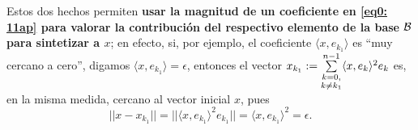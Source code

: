 \begin{nota}
Estos dos hechos permiten \textbf{usar la magnitud de un coeficiente en 
\eqref{eq0: 11ap} para valorar la contribución del respectivo 
elemento de la base $\mathcal{B}$ para sintetizar a $x$};
en efecto, si, por ejemplo, el coeficiente $\langle x, e_{k_{1}} \rangle$
es ``muy cercano a cero'', digamos $\langle x, e_{k_{1}} \rangle = \epsilon$,  
entonces el vector 
$x_{k_{1}}:= \sum\limits_{\substack{ {k=0}, \\  {k \neq k_{1}} }}^{n-1}
\langle x , e_{k} \rangle^{2} e_{k}$
es, en la misma medida, cercano al vector inicial $x$, pues
\[
|| x - x_{k_{1}} || = || \langle x , e_{k_{1}} \rangle^{2} e_{k_{1}} ||
= \langle x , e_{k_{1}} \rangle^{2} = \epsilon.
\]
\end{nota}


\begin{comment}
Ya estamos listos par dar un ejemplo de una BON que
no es una base de Hamel.

\begin{ejemplo}
(de un subconjunto de un espacio
con producto punto que sea maximal ortonormal pero no maximal l.i.)
\TODO{Dónde introduzco al espacio de sucesiones $\ell^{2}$??
Yo creo que justo después de G-S, o sea, justo antes de esta.}

Considere al espacio de Hilbert
\[
\ell^{2}= \{ x: \IN \longrightarrow \IR | \hspace{0.2cm} 
\suma{k=1}{\infty}{|x_{k}|^{2}}< \infty \}
\]

con el producto punto
\[
<x,y>= \suma{k=1}{\infty}{x_{k}y_{k}}.
\]

Sea el subconjunto de este
\[
\cali{B}:= \{e_{i}: \IN \longrightarrow \IR| \hspace{0.2cm} i \in \IN \},
\]

donde $e_{i}$ es la sucesión dada por la regla
\[
e_{i}(j)=\delta_{i,j}, \hspace{0.4cm} j \in \IN.
\]


\begin{itemize}
\item[i)]($\cali{B}$ es un subconjunto maximal ortonormal) 
Claro que todos los elementos de $\cali{B}$ tienen norma uno;
además, si $x \in \ell^{2}$ es tal que para todo índice $i$
se tiene la igualdad
\[
x_{i}= \suma{k=1}{\infty}{x(k)e_{i}(k)}=<x,e_{i}>=0,
\]
entonces $x$ es la sucesión cero, o sea,
el elemento cero del espacio
$\ell^{2}$. Según la equivalencia
$a) \iff b)$ del teorema \ref{thm: Coway, 4.13}, esto basta
para demostrar que $\cali{B}$ es BON de $\ell^{2}$.

\item

\end{itemize}


\TODO{AAAAA}

\end{ejemplo}
\end{comment}


